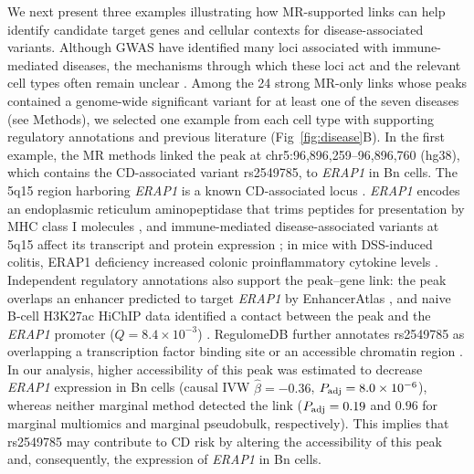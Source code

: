 \noindent We next present three examples illustrating how MR-supported links can help identify candidate target genes and cellular contexts for disease-associated variants. Although GWAS have identified many loci associated with immune-mediated diseases, the mechanisms through which these loci act and the relevant cell types often remain unclear \cite{gallagher2018postgwas}. Among the 24 strong MR-only links whose peaks contained a genome-wide significant variant for at least one of the seven diseases (see Methods), we selected one example from each cell type with supporting regulatory annotations and previous literature (Fig~\ref{fig:disease}B). In the first example, the MR methods linked the peak at chr5:96,896,259--96,896,760 (hg38), which contains the CD-associated variant rs2549785, to \textit{ERAP1} in Bn cells. The 5q15 region harboring \textit{ERAP1} is a known CD-associated locus \cite{franke2010cd}. \textit{ERAP1} encodes an endoplasmic reticulum aminopeptidase that trims peptides for presentation by MHC class I molecules \cite{hattori2013erap}, and immune-mediated disease-associated variants at 5q15 affect its transcript and protein expression \cite{hanson2018erap}; in mice with DSS-induced colitis, ERAP1 deficiency increased colonic proinflammatory cytokine levels \cite{blake2022erap1}. Independent regulatory annotations also support the peak--gene link: the peak overlaps an enhancer predicted to target \textit{ERAP1} by EnhancerAtlas \cite{gao2020enhanceratlas}, and naive B-cell H3K27ac HiChIP data identified a contact between the peak and the \textit{ERAP1} promoter ($Q=8.4\times10^{-3}$) \cite{chandra2021pieqtl}. RegulomeDB further annotates rs2549785 as overlapping a transcription factor binding site or an accessible chromatin region \cite{boyle2012regulomedb,dong2023regulomedb}. In our analysis, higher accessibility of this peak was estimated to decrease \textit{ERAP1} expression in Bn cells (causal IVW \(\hat{\beta}=-0.36\), \(P_{\mathrm{adj}}=8.0\times10^{-6}\)), whereas neither marginal method detected the link (\(P_{\mathrm{adj}}=0.19\) and \(0.96\) for marginal multiomics and marginal pseudobulk, respectively). This implies that rs2549785 may contribute to CD risk by altering the accessibility of this peak and, consequently, the expression of \textit{ERAP1} in Bn cells.

